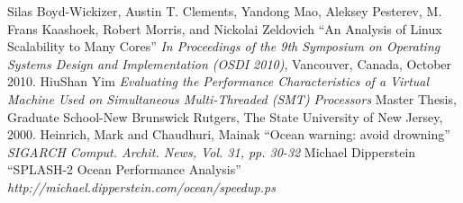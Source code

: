 \begin{thebibliography}{9}
Silas Boyd-Wickizer, Austin T. Clements, Yandong Mao, Aleksey Pesterev,
M. Frans Kaashoek, Robert Morris, and Nickolai Zeldovich
``An Analysis of Linux Scalability to Many Cores''
{\em In Proceedings of the 9th Symposium on Operating Systems Design and Implementation (OSDI 2010)}, Vancouver, Canada, October 2010.
HiuShan Yim
{\em Evaluating the Performance Characteristics of a Virtual Machine Used on Simultaneous Multi-Threaded (SMT) Processors}
Master Thesis, Graduate School-New Brunswick Rutgers, 
The State University of New Jersey, 2000.
Heinrich, Mark and Chaudhuri, Mainak
``Ocean warning: avoid drowning''
{\em SIGARCH Comput. Archit. News, Vol. 31, pp. 30-32}
Michael Dipperstein
``SPLASH-2 Ocean Performance Analysis''
{\em http://michael.dipperstein.com/ocean/speedup.ps}
\end{thebibliography}

